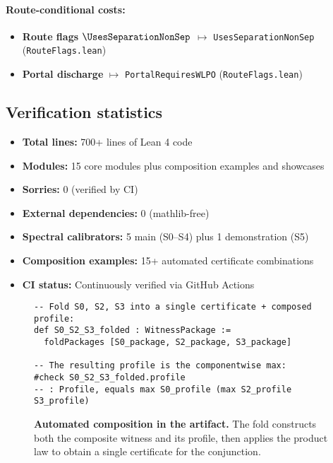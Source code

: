 \documentclass[11pt]{article}
\newcommand{\lean}[1]{\texttt{#1}}
\theoremstyle{plain}
\theoremstyle{definition}
\theoremstyle{remark}
\begin{document}
\paragraph{Route-conditional costs:}
\begin{itemize}
\item \textbf{Route flags} $\UsesSeparationNonSep$ $\mapsto$ \lean{UsesSeparationNonSep} (\texttt{RouteFlags.lean})
\item \textbf{Portal discharge} $\mapsto$ \lean{PortalRequiresWLPO} (\texttt{RouteFlags.lean})
\end{itemize}

\subsection{Verification statistics}
\begin{itemize}
\item \textbf{Total lines:} 700+ lines of Lean 4 code
\item \textbf{Modules:} 15 core modules plus composition examples and showcases
\item \textbf{Sorries:} 0 (verified by CI)
\item \textbf{External dependencies:} 0 (mathlib-free)
\item \textbf{Spectral calibrators:} 5 main (S0--S4) plus 1 demonstration (S5)
\item \textbf{Composition examples:} 15+ automated certificate combinations
\item \textbf{CI status:} Continuously verified via GitHub Actions
\end{itemize}


\begin{figure}[t]
\centering
\begin{minipage}{0.92\linewidth}
\begin{verbatim}
-- Fold S0, S2, S3 into a single certificate + composed profile:
def S0_S2_S3_folded : WitnessPackage :=
  foldPackages [S0_package, S2_package, S3_package]

-- The resulting profile is the componentwise max:
#check S0_S2_S3_folded.profile
-- : Profile, equals max S0_profile (max S2_profile S3_profile)
\end{verbatim}
\end{minipage}
\caption{\textbf{Automated composition in the artifact.}
The fold constructs both the composite witness and its profile, then applies the
product law to obtain a single certificate for the conjunction.}
\label{fig:lean-folding-snippet}
\end{figure}
\end{document}
